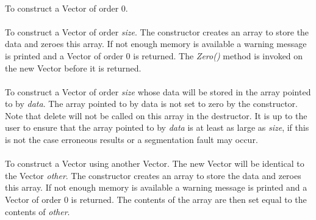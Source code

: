  \\
 \\
 \\
 \\
 \\
 \\
 \\
 \\ 
 \\ 


  \\
  \\
To construct a Vector of order $0$. \\

  \\
To construct a Vector of order {\em size}. The constructor creates an
array to store the data and zeroes this array. If not enough memory is
available a warning message is printed and a Vector of order $0$ is 
returned. The {\em Zero()}  method is invoked on the new Vector before
it is returned.\\ 

  \\
To construct a Vector of order {\em size} whose data will be stored in the
array pointed to by {\em data}. The array pointed to by data is not set to
zero by the constructor. Note that delete will not be called on this array
in the destructor. It is up to the user to ensure that the array pointed to
by {\em data} is at least as large as {\em size}, if this is not the case
erroneous results or a segmentation fault may occur.\\

  \\
To construct a Vector using another Vector. The new Vector will be
identical to the Vector {\em other}. The constructor creates an array
to store the data and zeroes this array. If not enough memory is available
a warning message is printed and a Vector of order $0$ is returned. The
contents of the array are then set equal to the contents of {\em
other}.\\ 

